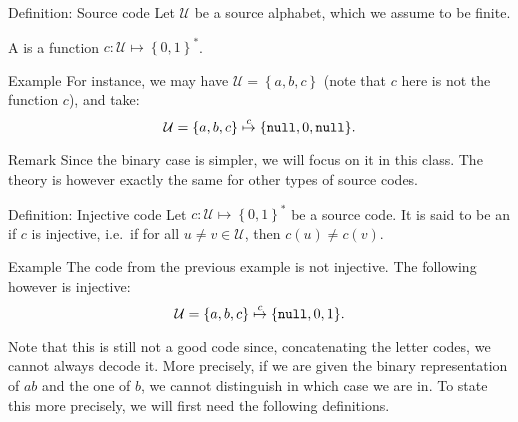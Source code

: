 \documentclass[a4paper]{article}
\begin{document}
\begin{parag}{Definition: Source code}
    Let $\mathcal{U}$ be a source alphabet, which we assume to be finite. 

    A  is a function $c: \mathcal{U} \mapsto \left\{0,1\right\}^*$.

    \begin{subparag}{Example}
        For instance, we may have $\mathcal{U} = \left\{a, b, c\right\}$ (note that $c$ here is not the function $c$), and take: 
        \[\mathcal{U} = \left\{a, b, c\right\} \over{\mapsto}{$c$}  \left\{\emptystring, 0, \emptystring\right\}.\]
    \end{subparag}

    \begin{subparag}{Remark}
        Since the binary case is simpler, we will focus on it in this class. The theory is however exactly the same for other types of source codes. 
    \end{subparag}
\end{parag}

\begin{parag}{Definition: Injective code}
    Let $c: \mathcal{U} \mapsto \left\{0, 1\right\}^*$ be a source code. It is said to be an  if $c$ is injective, i.e.~if for all $u \neq v \in \mathcal{U}$, then $c\left(u\right) \neq c\left(v\right)$.

    \begin{subparag}{Example}
        The code from the previous example is not injective. The following however is injective:
        \[\mathcal{U} = \left\{a, b, c\right\} \over{\mapsto}{$c$}  \left\{\emptystring, 0, 1\right\}.\]

        Note that this is still not a good code since, concatenating the letter codes, we cannot always decode it. More precisely, if we are given the binary representation of $ab$ and the one of $b$, we cannot distinguish in which case we are in. To state this more precisely, we will first need the following definitions.
    \end{subparag}
\end{parag}
\end{document}
